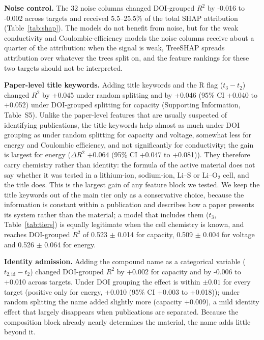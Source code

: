 \documentclass[journal=jcisd8,manuscript=article,layout=traditional]{achemso}
\begin{document}
\textbf{Noise control.} The 32 noise columns changed DOI-grouped $R^2$ by -0.016 to -0.002 across targets and received 5.5--25.5\% of the total SHAP attribution (Table~\ref{tab:shap}). The models do not benefit from noise, but for the weak conductivity and Coulombic-efficiency models the noise columns receive about a quarter of the attribution: when the signal is weak, TreeSHAP spreads attribution over whatever the trees split on, and the feature rankings for these two targets should not be interpreted.

\textbf{Paper-level title keywords.} Adding title keywords and the R flag ($t_3 - t_2$) changed $R^2$ by +0.045 under random splitting and by +0.046 (95\% CI +0.040 to +0.052) under DOI-grouped splitting for capacity (Supporting Information, Table~S5). Unlike the paper-level features that are usually suspected of identifying publications, the title keywords help almost as much under DOI grouping as under random splitting for capacity and voltage, somewhat less for energy and Coulombic efficiency, and not significantly for conductivity; the gain is largest for energy ($\Delta R^2$ +0.064 (95\% CI +0.047 to +0.081)). They therefore carry chemistry rather than identity: the formula of the active material does not say whether it was tested in a lithium-ion, sodium-ion, Li--S or Li--O$_2$ cell, and the title does. This is the largest gain of any feature block we tested. We keep the title keywords out of the main tier only as a conservative choice, because the information is constant within a publication and describes how a paper presents its system rather than the material; a model that includes them ($t_3$, Table~\ref{tab:tiers}) is equally legitimate when the cell chemistry is known, and reaches DOI-grouped $R^2$ of 0.523 $\pm$ 0.014 for capacity, 0.509 $\pm$ 0.004 for voltage and 0.526 $\pm$ 0.064 for energy.

\textbf{Identity admission.} Adding the compound name as a categorical variable ($t_{2,\mathrm{id}} - t_2$) changed DOI-grouped $R^2$ by +0.002 for capacity and by -0.006 to +0.010 across targets. Under DOI grouping the effect is within $\pm0.01$ for every target (positive only for energy, +0.010 (95\% CI +0.003 to +0.018)); under random splitting the name added slightly more (capacity +0.009), a mild identity effect that largely disappears when publications are separated. Because the composition block already nearly determines the material, the name adds little beyond it.
\end{document}
